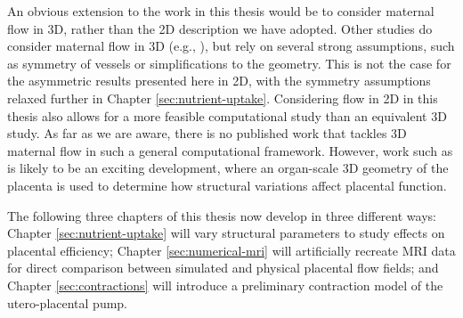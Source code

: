         An obvious extension to the work in this thesis would be to consider maternal flow in 3D, rather than the 2D description we have adopted. Other studies do consider maternal flow in 3D (e.g., \cite{chernyavskyMathematicalModelIntervillous2010,meklerImpactTissuePorosity2022}), but rely on several strong assumptions, such as symmetry of vessels or simplifications to the geometry. This is not the case for the asymmetric results presented here in 2D, with the symmetry assumptions relaxed further in Chapter \ref{sec:nutrient-uptake}. Considering flow in 2D in this thesis also allows for a more feasible computational study than an equivalent 3D study. As far as we are aware, there is no published work that tackles 3D maternal flow in such a general computational framework. However, work such as \citeauthor{crowsonInvestigatingPlacentalHemodynamics2024} \cite{crowsonInvestigatingPlacentalHemodynamics2024} is likely to be an exciting development, where an organ-scale 3D geometry of the placenta is used to determine how structural variations affect placental function.

        The following three chapters of this thesis now develop in three different ways: Chapter \ref{sec:nutrient-uptake} will vary structural parameters to study effects on placental efficiency; Chapter \ref{sec:numerical-mri} will artificially recreate MRI data for direct comparison between simulated and physical placental flow fields; and Chapter \ref{sec:contractions} will introduce a preliminary contraction model of the utero-placental pump.